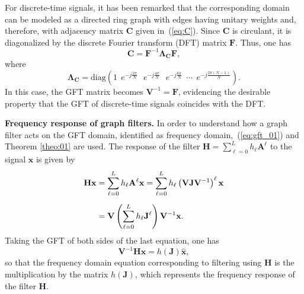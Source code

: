 For discrete-time signals, it has been remarked that the corresponding domain can be modeled as a directed ring graph with edges having unitary weights and, therefore, with adjacency matrix $ \mathbf{C} $ given in~(\ref{eq:C}). Since $ \mathbf{C} $ is circulant, it is diagonalized by the discrete Fourier transform (DFT) matrix $ \mathbf{F} $. Thus, one has
\begin{equation}\label{eq:diag_C}
\mathbf{C} = \mathbf{F}^{-1} \mathbf{\Lambda}_{\mathbf{C}} \mathbf{F},
\end{equation}
where $$ \mathbf{\Lambda}_{\mathbf{C}} = \text{diag}\left(
1 \:\
e^{-j \frac{2\pi}{N}} \:\:\
e^{-j \frac{4\pi}{N}}\:\: \
e^{-j \frac{6\pi}{N}} \:\: \cdots \:\:
e^{-j \frac{2\pi (N-1)}{N}}
\right).$$In this case, the GFT matrix becomes $ \mathbf{V}^{-1} = \mathbf{F} $, evidencing the desirable property that the GFT of discrete-time signals coincides with the DFT.

\vspace{0.25cm}
\noindent\textbf{Frequency response of graph filters.} In order to understand how a graph filter acts on the GFT domain, identified as frequency domain,~(\ref{eq:gft_01}) and Theorem \ref{theo:01} are used. The response of the filter $ \mathbf{H} =\sum_{\ell=0}^{L} h_\ell \mathbf{A}^\ell $ to the signal $ \mathbf{x} $ is given by
\begin{align}\label{eq:resposta_freq_01}
\mathbf{H} \mathbf{x} &= \sum_{\ell=0}^{L} h_\ell \mathbf{A}^\ell \mathbf{x} =
\sum_{\ell=0}^{L} h_\ell \left(\mathbf{V} \mathbf{J} \mathbf{V}^{-1}\right)^\ell \mathbf{x} \notag \\[0.5em]
&= \mathbf{V} \left(\sum_{\ell=0}^{L} h_\ell \mathbf{J}^\ell \right) \mathbf{V}^{-1} \mathbf{x}.
\end{align}
Taking the GFT of both sides of the last equation, one has
\begin{equation}\label{eq:resposta_freq_02}
\mathbf{V}^{-1} \mathbf{H} \mathbf{x} =
h(\mathbf{J}) \widehat{\mathbf{x}},
\end{equation}
so that the frequency domain equation corresponding to filtering using $ \mathbf{H} $ is the multiplication by the matrix $ h(\mathbf{J}) $, which represents the frequency response of the filter $ \mathbf{H} $.

